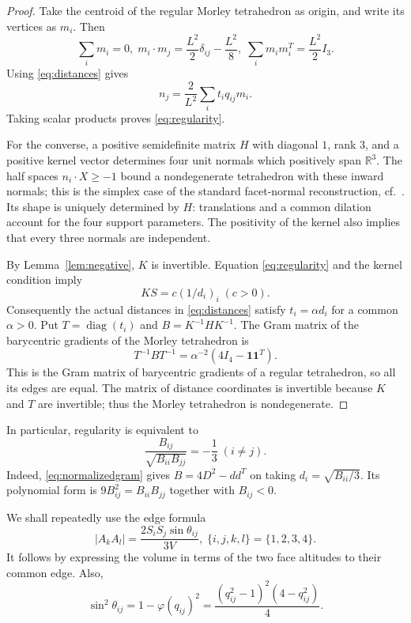 \documentclass[11pt]{article}
\theoremstyle{definition}
\theoremstyle{remark}
\DeclareMathOperator{\diag}{diag}
\newcommand{\R}{\mathbb{R}}
\newcommand{\one}{\mathbf 1}
\newcommand{\ph}{\varphi}
\begin{document}
\begin{proof}
Take the centroid of the regular Morley tetrahedron as origin, and write its vertices as $m_i$. Then
\[
\sum_i m_i=0,\;
m_i\cdot m_j=\frac{L^2}{2}\delta_{ij}-\frac{L^2}{8},
\; \sum_i m_im_i^T=\frac{L^2}{2}I_3.
\]
Using \eqref{eq:distances} gives
\[
n_j=\frac{2}{L^2}\sum_i t_iq_{ij}m_i.
\]
Taking scalar products proves \eqref{eq:regularity}.

For the converse, a positive semidefinite matrix $H$ with diagonal $1$, rank $3$, and a positive kernel vector determines four unit normals which positively span $\R^3$. The half spaces $n_i\cdot X\ge-1$ bound a nondegenerate tetrahedron with these inward normals; this is the simplex case of the standard facet-normal reconstruction, cf.~\cite{Schneider}. Its shape is uniquely determined by $H$: translations and a common dilation account for the four support parameters. The positivity of the kernel also implies that every three normals are independent.

By Lemma~\ref{lem:negative}, $K$ is invertible. Equation \eqref{eq:regularity} and the kernel condition imply
\[
KS=c(1/d_i)_i\;(c>0).
\]
Consequently the actual distances in \eqref{eq:distances} satisfy $t_i=\alpha d_i$ for a common $\alpha>0$. Put $T=\diag(t_i)$ and $B=K^{-1}HK^{-1}$. The Gram matrix of the barycentric gradients of the Morley tetrahedron is
\[
T^{-1}BT^{-1}=\alpha^{-2}(4I_4-\one\one^T).
\]
This is the Gram matrix of barycentric gradients of a regular tetrahedron, so all its edges are equal. The matrix of distance coordinates is invertible because $K$ and $T$ are invertible; thus the Morley tetrahedron is nondegenerate.
\end{proof}

In particular, regularity is equivalent to
\begin{equation}
\frac{B_{ij}}{\sqrt{B_{ii}B_{jj}}}=-\frac13\;(i\ne j).
\label{eq:normalizedgram}
\end{equation}
Indeed, \eqref{eq:normalizedgram} gives $B=4D^2-dd^T$ on taking $d_i=\sqrt{B_{ii}/3}$. Its polynomial form is $9B_{ij}^2=B_{ii}B_{jj}$ together with $B_{ij}<0$.

We shall repeatedly use the edge formula
\begin{equation}
|A_kA_l|=\frac{2S_iS_j\sin\theta_{ij}}{3V},
\; \{i,j,k,l\}=\{1,2,3,4\}.
\label{eq:edge}
\end{equation}
It follows by expressing the volume in terms of the two face altitudes to their common edge. Also,
\[
\sin^2\theta_{ij}=1-\ph(q_{ij})^2
=\frac{(q_{ij}^2-1)^2(4-q_{ij}^2)}4.
\]
\end{document}
